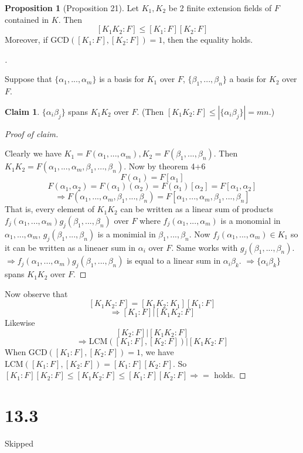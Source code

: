 \documentclass{article}
\theoremstyle{definition}
\newtheorem{prop}{Proposition}
\newtheorem*{clm}{Claim}
\newenvironment{proofs}[1][\proofname]{%
  \begin{proof}[#1]$ $\par\nobreak\ignorespaces
}{%
  \end{proof}
}
\begin{document}
\begin{prop}[Proposition 21]
	Let $K_1, K_2$ be 2 finite extension fields of $F$ contained in $K$.
	Then 
	\[
		[K_1K_2:F] \leq [K_1:F][K_2:F]
	\]
	Moreover, if $\text{GCD}([K_1:F], [K_2:F]) = 1$, then the equality holds.
\end{prop}

\begin{proofs}
	Suppose that $\{\alpha_1, ..., \alpha_m \}$ is a basis for $K_1$ over $F$, $\{\beta_1, ..., \beta_n\}$ a basis for $K_2$ over $F$.
	\begin{clm}
		$\{\alpha_i \beta_j\}$ spans $K_1 K_2$ over $F$.
		(Then $[K_1 K_2:F] \leq |\{\alpha_i \beta_j\}| = mn$.)
	\end{clm}
	
	\begin{proofs}[Proof of claim]
		Clearly we have $K_1 = F(\alpha_1, ..., \alpha_m), K_2 = F(\beta_1, ..., \beta_n)$.
		Then $K_1 K_2 = F(\alpha_1, ..., \alpha_m, \beta_1, ..., \beta_n)$.
		Now by theorem 4+6
		\[
			F(\alpha_1) = F[\alpha_1]
		\]
		\[
			F(\alpha_1, \alpha_2) = F(\alpha_1)(\alpha_2) = F(\alpha_1)[\alpha_2] = F[\alpha_1, \alpha_2]
		\]
		\[
			\Rightarrow F(\alpha_1, ..., \alpha_m, \beta_1, ..., \beta_n) = F[\alpha_1, ..., \alpha_m, \beta_1, ..., \beta_n]
		\]
		That is, every element of $K_1 K_2$ can be written as a linear sum of products $f_j(\alpha_1, ..., \alpha_m) g_j(\beta_1, ..., \beta_n)$ over $F$ where $f_j(\alpha_1, ..., \alpha_m)$ is a monomial in $\alpha_1, ..., \alpha_m$, $g_j(\beta_1, ..., \beta_n)$ is a monimial in $\beta_1, ..., \beta_n$.
		Now $f_j(\alpha_1, ..., \alpha_m) \in K_1$ so it can be written as a lineaer sum in $\alpha_i$ over $F$.
		Same works with $g_j(\beta_1, ..., \beta_n)$.
		$\Rightarrow f_j(\alpha_1, ..., \alpha_m) g_j(\beta_1, ..., \beta_n)$ is equal to a linear sum in $\alpha_i \beta_k$.
		$\Rightarrow \{\alpha_i \beta_k\}$ spans $K_1 K_2$ over $F$.
	\end{proofs}
	Now observe that 
	\[
		[K_1 K_2:F] = [K_1 K_2:K_1][K_1:F]
	\]
	\[
		\Rightarrow [K_1:F]|[K_1 K_2:F]
	\]
	Likewise
	\[
		[K_2:F]|[K_1 K_2:F]
	\]
	\[
		\Rightarrow \text{LCM}([K_1:F], [K_2:F]) | [K_1 K_2:F]
	\]
	When $\text{GCD}([K_1:F], [K_2:F]) = 1$, we have $\text{LCM}([K_1:F], [K_2:F]) = [K_1:F][K_2:F]$.
	So $[K_1:F][K_2:F] \leq [K_1 K_2:F] \leq [K_1:F][K_2:F] \Rightarrow = $ holds.
\end{proofs}

\section*{13.3}
Skipped
\end{document}
